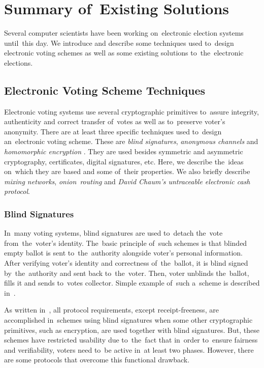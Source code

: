 \chapter{Summary of~Existing Solutions}
\label{kap:existing}
Several computer scientists have been working on~electronic election systems until~this day. We introduce and describe some techniques used to~design electronic voting schemes as well as some existing solutions to~the~electronic elections. 

\section{Electronic Voting Scheme Techniques}

Electronic voting systems use several cryptographic primitives to~assure integrity, authenticity and correct transfer of~votes as well as to~preserve voter's anonymity. There are at least three specific techniques used to~design an~electronic voting scheme. These are \emph{blind signatures}, \emph{anonymous channels} and \emph{homomorphic encryption} \cite{Haenni}. They are used besides symmetric and asymmetric cryptography, certificates, digital signatures, etc. Here, we describe the~ideas on~which they are based and some of~their properties. We also briefly describe \emph{mixing networks}, \emph{onion~routing} and \emph{David Chaum's untraceable electronic cash protocol}.

\subsection{Blind Signatures}
In~many voting systems, blind signatures are used to~detach the~vote from~the~voter's identity. The~basic principle of~such schemes is that blinded empty ballot is sent to~the~authority alongside voter's personal information. After verifying voter's identity and correctness of~the~ballot, it is blind signed by~the~authority and sent back to~the~voter. Then, voter unblinds the~ballot, fills it and sends to~votes collector. Simple example of~such a~scheme is described in~\cite{Standford}.

As written in~\cite{Haenni}, all protocol requirements, except receipt-freeness, are accomplished in~schemes using blind signatures when some other cryptographic primitives, such as encryption, are used together with blind signatures. But, these schemes have restricted usability due to~the~fact that in~order to~ensure fairness and verifiability, voters need to~be active in~at least two phases. %
However, there are some protocols that overcome this functional drawback.
